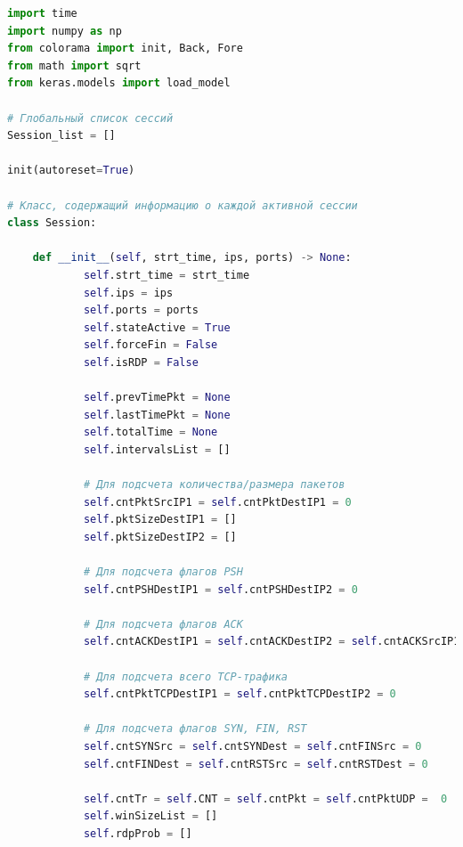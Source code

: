 \documentclass[spec, och, diploma]{SCWorks}
\begin{document}
    \begin{lstlisting}[language=Python]
import time
import numpy as np
from colorama import init, Back, Fore
from math import sqrt
from keras.models import load_model

# Глобальный список сессий
Session_list = []

init(autoreset=True)

# Класс, содержащий информацию о каждой активной сессии
class Session:

    def __init__(self, strt_time, ips, ports) -> None:
            self.strt_time = strt_time
            self.ips = ips
            self.ports = ports
            self.stateActive = True
            self.forceFin = False
            self.isRDP = False

            self.prevTimePkt = None
            self.lastTimePkt = None
            self.totalTime = None
            self.intervalsList = []

            # Для подсчета количества/размера пакетов
            self.cntPktSrcIP1 = self.cntPktDestIP1 = 0
            self.pktSizeDestIP1 = []
            self.pktSizeDestIP2 = []

            # Для подсчета флагов PSH
            self.cntPSHDestIP1 = self.cntPSHDestIP2 = 0

            # Для подсчета флагов ACK
            self.cntACKDestIP1 = self.cntACKDestIP2 = self.cntACKSrcIP1 = 0

            # Для подсчета всего TCP-трафика
            self.cntPktTCPDestIP1 = self.cntPktTCPDestIP2 = 0

            # Для подсчета флагов SYN, FIN, RST
            self.cntSYNSrc = self.cntSYNDest = self.cntFINSrc = 0
            self.cntFINDest = self.cntRSTSrc = self.cntRSTDest = 0

            self.cntTr = self.CNT = self.cntPkt = self.cntPktUDP =  0
            self.winSizeList = []
            self.rdpProb = []


\end{lstlisting}
\end{document}
